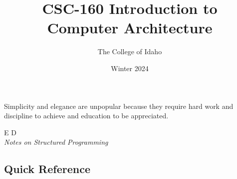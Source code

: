 \documentclass[symmetric]{tufte-handout}
\title{CSC-160 Introduction to Computer Architecture}
\date{Winter 2024}
\author{The College of Idaho}
\begin{document}
\else
\fi
\maketitle
\begin{fullwidth}
\epigraph{%
    Simplicity and elegance are unpopular because they require hard work and
    discipline to achieve and education to be appreciated.%
}{E D \\ \emph{Notes on Structured Programming}}
\end{fullwidth}

\subsection{Quick Reference} \label{ssec:quickreference}
    \vspace*{-2ex}
\end{document}
